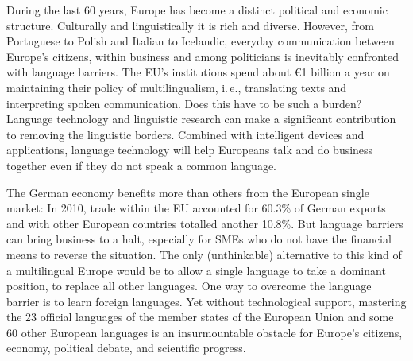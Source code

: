\documentclass[]{../../metanetpaper}
\begin{document}

\setcounter{section}{0}
\setcounter{figure}{0}

\cleardoublepage



\begin{multicols}{2}

During the last 60 years, Europe has become a distinct political and economic structure. Culturally and linguistically it is rich and diverse. However, from Portuguese to Polish and Italian to Icelandic, everyday communication between Europe’s citizens, within business and among politicians is inevitably confronted with language barriers. The EU's institutions spend about €1 billion a year on maintaining their policy of multilingualism, i.\,e., translating texts and interpreting spoken communication. Does this have to be such a burden? Language technology and linguistic research can make a significant contribution to removing the linguistic borders. Combined with intelligent devices and applications, language technology will help Europeans talk and do business together even if they do not speak a common language. 


The German economy benefits more than others from the European single market: In 2010, trade within the EU accounted for 60.3\% of German exports and with other European countries totalled another 10.8\%. But language barriers can bring business to a halt, especially for SMEs who do not have the financial means to reverse the situation. The only (unthinkable) alternative to this kind of a multilingual Europe would be to allow a single language to take a dominant position, to replace all other languages. 
One way to overcome the language barrier is to learn foreign languages. Yet without technological support, mastering the 23 official languages of the member states of the European Union and some 60 other European languages is an insurmountable obstacle for Europe’s citizens, economy, political debate, and scientific progress. 


\end{multicols}
\end{document}
